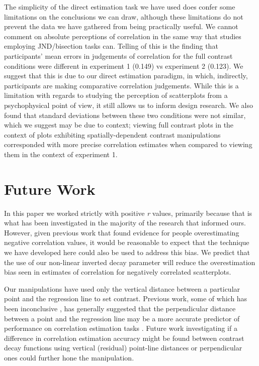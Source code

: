 \documentclass[preprint, 3p,
authoryear]{elsarticle} %
\begin{document}
The simplicity of the direct estimation task we have used does confer
some limitations on the conclusions we can draw, although these
limitations do not prevent the data we have gathered from being
practically useful. We cannot comment on absolute perceptions of
correlation in the same way that studies employing JND/bisection tasks
can. Telling of this is the finding that participants' mean errors in
judgements of correlation for the full contrast conditions were
different in experiment 1 (0.149) vs experiment 2 (0.123). We suggest
that this is due to our direct estimation paradigm, in which,
indirectly, participants are making comparative correlation judgements.
While this is a limitation with regards to studying the perception of
scatterplots from a psychophysical point of view, it still allows us to
inform design research. We also found that standard deviations between
these two conditions were not similar, which we suggest may be due to
context; viewing full contrast plots in the context of plots exhibiting
spatially-dependent contrast manipulations corresponded with more
precise correlation estimates when compared to viewing them in the
context of experiment 1.

\hypertarget{future-work}{%
\section{Future Work}\label{future-work}}

In this paper we worked strictly with positive \emph{r} values,
primarily because that is what has been investigated in the majority of
the research that informed ours. However, given previous work
\citep{sher_2017} that found evidence for people overestimating negative
correlation values, it would be reasonable to expect that the technique
we have developed here could also be used to address this bias. We
predict that the use of our non-linear inverted decay parameter will
reduce the overestimation bias seen in estimates of correlation for
negatively correlated scatterplots.

Our manipulations have used only the vertical distance between a
particular point and the regression line to set contrast. Previous work,
some of which has been inconclusive \citep{meyer_1997}, has generally
suggested that the perpendicular distance between a point and the
regression line may be a more accurate predictor of performance on
correlation estimation tasks
\citep{cleveland_1982, yang_2019, rensink_2017}. Future work
investigating if a difference in correlation estimation accuracy might
be found between contrast decay functions using vertical (residual)
point-line distances or perpendicular ones could further hone the
manipulation.
\end{document}
